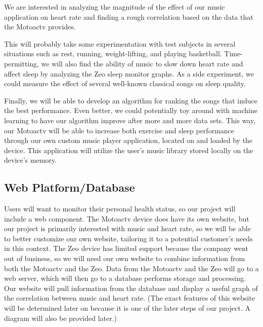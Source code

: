 \documentclass[letterpaper,english]{scrreprt}
\begin{document}
We are interested in analyzing the magnitude of the effect of our music application on heart rate and finding a rough correlation based on the data that the Motoactv provides.

This will probably take some experimentation with test subjects in several situations such as rest, running, weight-lifting, and playing basketball. Time-permitting, we will also find the ability of music to slow down heart rate and affect sleep by analyzing the Zeo sleep monitor graphs. As a side experiment, we could measure the effect of several well-known classical songs on sleep quality.
			 
Finally, we will be able to develop an algorithm for ranking the songs that induce the best performance. Even better, we could potentially toy around with machine learning to have our algorithm improve after more and more data sets. This way, our Motoactv will be able to increase both exercise and sleep performance through our own custom music player application, located on and loaded by the device. This application will utilize the user's music library stored locally on the device's memory.

\subsection{Web Platform/Database}
Users will want to monitor their personal health status, so our project will include a web component. The Motoactv device does have its own website, but our project is primarily interested with music and heart rate, so we will be able to better customize our own website, tailoring it to a potential customer's needs in this context. The Zeo device has limited support because the company went out of business, so we will need our own website to combine information from both the Motoactv and the Zeo. Data from the Motoactv and the Zeo will go to a web server, which will then go to a database performs storage and processing. Our website will pull information from the database and display a useful graph of the correlation between music and heart rate. (The exact features of this website will be determined later on because it is one of the later steps of our project. A diagram will also be provided later.)
\end{document}
